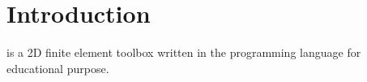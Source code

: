 
\chapter{Introduction}
\label{sect:Intro}

\LIBNAME is a 2D finite element toolbox written in the programming language \MATLAB for educational
purpose.